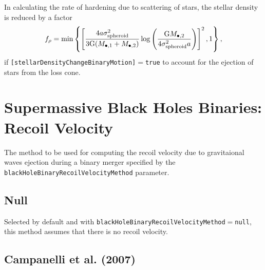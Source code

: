 In calculating the rate of hardening due to scattering of stars, the stellar density is reduced by a factor \citep{volonteri_assembly_2003}
\begin{equation}
f_\rho = \hbox{min}\left\{ \left[ { 4 a \sigma_{\rm spheroid}^2 \over 3 {\rm G} (M_{\bullet, 1}+M_{\bullet, 2})} \log\left({{\rm G} M_{\bullet, 2} \over 4 \sigma_{\rm spheroid}^2  a }\right) \right]^2 , 1 \right\},
\end{equation}
if {\tt [stellarDensityChangeBinaryMotion]}$=${\tt true} to account for the ejection of stars from the loss cone.

\section{Supermassive Black Holes Binaries: Recoil Velocity}\label{sec:binaryBlackHoleRecoil}

The method to be used for computing the recoil velocity due to gravitaional waves ejection during a binary merger specified by the {\tt blackHoleBinaryRecoilVelocityMethod} parameter.

\subsection{Null}

Selected by default and with {\tt blackHoleBinaryRecoilVelocityMethod}$=${\tt null}, this method assumes that there is no recoil velocity.

\subsection{Campanelli et al. (2007)}

